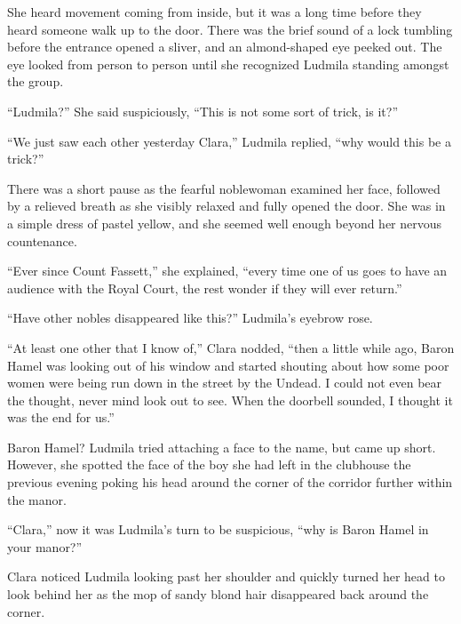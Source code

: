  

She heard movement coming from inside, but it was a long time before they heard someone walk up to the door. There was the brief sound of a lock tumbling before the entrance opened a sliver, and an almond-shaped eye peeked out. The eye looked from person to person until she recognized Ludmila standing amongst the group.

 

“Ludmila?” She said suspiciously, “This is not some sort of trick, is it?”

 

“We just saw each other yesterday Clara,” Ludmila replied, “why would this be a trick?”

 

There was a short pause as the fearful noblewoman examined her face, followed by a relieved breath as she visibly relaxed and fully opened the door. She was in a simple dress of pastel yellow, and she seemed well enough beyond her nervous countenance.

 

“Ever since Count Fassett,” she explained, “every time one of us goes to have an audience with the Royal Court, the rest wonder if they will ever return.”

 

“Have other nobles disappeared like this?” Ludmila’s eyebrow rose.

 

“At least one other that I know of,” Clara nodded, “then a little while ago, Baron Hamel was looking out of his window and started shouting about how some poor women were being run down in the street by the Undead. I could not even bear the thought, never mind look out to see. When the doorbell sounded, I thought it was the end for us.”

 

Baron Hamel? Ludmila tried attaching a face to the name, but came up short. However, she spotted the face of the boy she had left in the clubhouse the previous evening poking his head around the corner of the corridor further within the manor.

 

“Clara,” now it was Ludmila’s turn to be suspicious, “why is Baron Hamel in your manor?”

 

Clara noticed Ludmila looking past her shoulder and quickly turned her head to look behind her as the mop of sandy blond hair disappeared back around the corner.


